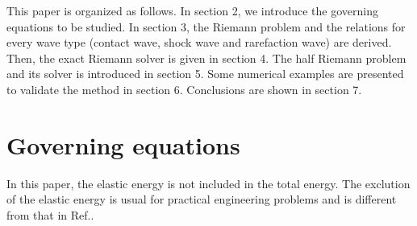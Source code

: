 \documentclass{article}
\numberwithin{equation}{section}
\numberwithin{table}{section}
\begin{document}

This paper is organized as follows. In section 2, we introduce the governing equations to be studied. In section 3, the Riemann problem and the relations for every wave type (contact wave, shock wave and rarefaction wave) are  derived.  Then,  the exact Riemann solver  is given in section 4. The half Riemann problem and its solver is introduced in section 5.  Some numerical examples are presented to validate the method in section 6.  Conclusions are shown in section 7.

\section{Governing equations}
In this paper, the elastic energy is not included in the total energy. The exclution of the elastic energy is usual for practical engineering problems \cite{maire2013nominally} and is different from that in Ref.\cite{gavrilyuk2008modelling}.

\end{document}
